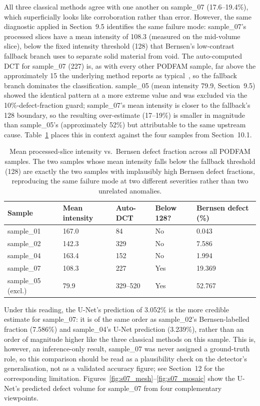 All three classical methods agree with one another on sample\_07 (17.6--19.4\%), which superficially
looks like corroboration rather than error. However, the same diagnostic applied in Section~9.5
identifies the same failure mode: sample\_07's processed slices have a mean intensity of 108.3
(measured on the mid-volume slice), below the fixed intensity threshold (128) that Bernsen's
low-contrast fallback branch uses to separate solid material from void. The auto-computed DCT for
sample\_07 (227) is, as with every other PODFAM sample, far above the approximately 15 the underlying
method reports as typical~\citep{Kim2017}, so the fallback branch dominates the classification.
sample\_05 (mean intensity 79.9, Section~9.5) showed the identical pattern at a more extreme value
and was excluded via the 10\%-defect-fraction guard; sample\_07's mean intensity is closer to the
fallback's 128 boundary, so the resulting over-estimate (17--19\%) is smaller in magnitude than
sample\_05's (approximately 52\%) but attributable to the same upstream cause.
Table~\ref{tab:sample07_diagnostic} places this in context against the four samples from
Section~10.1.

\begin{table}[htbp]
\centering
\caption{Mean processed-slice intensity vs.\ Bernsen defect fraction across all PODFAM samples. The
  two samples whose mean intensity falls below the fallback threshold (128) are exactly the two
  samples with implausibly high Bernsen defect fractions, reproducing the same failure mode at two
  different severities rather than two unrelated anomalies.}
\label{tab:sample07_diagnostic}
\begin{tabular}{lllll}
\toprule
\textbf{Sample} & \textbf{Mean intensity} & \textbf{Auto-DCT} & \textbf{Below 128?} & \textbf{Bernsen defect (\%)} \\
\midrule
sample\_01           & 167.0 & 84      & No  & 0.043 \\
sample\_02           & 142.3 & 329     & No  & 7.586 \\
sample\_04           & 163.4 & 152     & No  & 1.994 \\
sample\_07           & 108.3 & 227     & Yes & 19.369 \\
sample\_05 (excl.)   & 79.9  & 329--520 & Yes & 52.767 \\
\bottomrule
\end{tabular}
\end{table}

Under this reading, the U-Net's prediction of 3.052\% is the more credible estimate for sample\_07:
it is of the same order as sample\_02's Bernsen-labelled fraction (7.586\%) and sample\_04's U-Net
prediction (3.239\%), rather than an order of magnitude higher like the three classical methods on
this sample. This is, however, an inference-only result, sample\_07 was never assigned a
ground-truth role, so this comparison should be read as a plausibility check on the detector's
generalisation, not as a validated accuracy figure; see Section~12 for the corresponding limitation.
Figures~\ref{fig:s07_mesh}--\ref{fig:s07_mosaic} show the U-Net's predicted defect volume for
sample\_07 from four complementary viewpoints.

